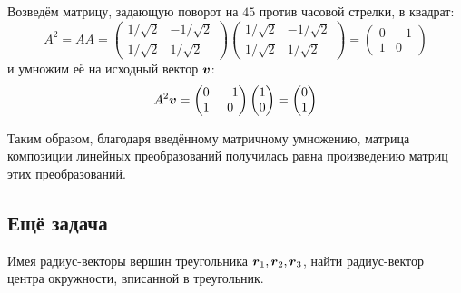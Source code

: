 \documentclass[a4paper,12pt]{article}
\begin{document}
  Возведём матрицу, задающую поворот на $45$ против часовой стрелки, в квадрат:
  \[
    A^2
    = A A
    = \begin{pmatrix}
        1/\sqrt{2} & -1/\sqrt{2}\\
        1/\sqrt{2} & 1/\sqrt{2}
      \end{pmatrix}
      \begin{pmatrix}
        1/\sqrt{2} & -1/\sqrt{2}\\
        1/\sqrt{2} & 1/\sqrt{2}
      \end{pmatrix}
    = \begin{pmatrix}
        0 & -1\\
        1 & 0
      \end{pmatrix}
  \]
  и умножим её на исходный вектор $\boldsymbol v$:
  \[
    A^2 \boldsymbol v
    = \begin{pmatrix}
        0 & -1\\
        1 & 0
      \end{pmatrix}
      \begin{pmatrix}
        1 \\ 0
      \end{pmatrix}
    = \begin{pmatrix}
        0 \\ 1
      \end{pmatrix}
  \]
  
  Таким образом, благодаря введённому матричному умножению, матрица композиции линейных преобразований получилась равна произведению матриц этих преобразований.
  
  
  \subsection{Ещё задача}
  
  \begin{problem}[1.36]
    Имея радиус-векторы вершин треугольника $\boldsymbol r_1, \boldsymbol r_2, \boldsymbol r_3$, найти радиус-вектор центра окружности, вписанной в треугольник.
  \end{problem}
  
\end{document}

